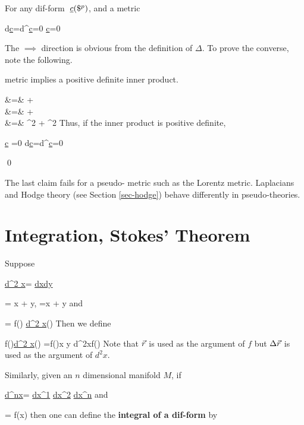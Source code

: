 \begin{claim}
\label{cl-d-c-ddagger-c}
For any dif-form $\pform{c}{p}$,
and a \Rien metric 

\beq
d\ul{c}=d^\dagger \ul{c}=0
\quad {}\quad
\Delta \ul{c}=0 
\eeq

\end{claim}
\proof

The $\implies$ direction is obvious
from the definition of $\Delta$.
To prove the converse, note 
the following.

\Rien metric implies  a positive definite inner product.

\beqa
{}
&=&
+
\\
&=&
+
\\
&=&
^2
+
^2
\eeqa
Thus,
if the inner product is 
positive definite,

\beq
\Delta\ul{c}
=0
\implies 
d\ul{c}=d^\dag \ul{c}=0
\eeq


\qed

The last claim fails for a pseudo-\Rien 
metric such as the Lorentz metric.
Laplacians and Hodge theory (see Section \ref{sec-hodge})
behave differently 
in pseudo-\Rien theories.


\section{Integration, Stokes' Theorem}

Suppose

\beq
\ul{d^2 x}= \ul{dx}\wedge\ul{dy}
\eeq

\beq
\vecr = x + y, \quad
\Delta\vecr =\Delta x 
+ \Delta y 
\eeq
and

\beq
\ul{\omega} = f(\vecr)
\ul{d^2 x}(\vecr)
\eeq
Then we define

\beq
\int \ul{\omega}\eqdef
\int
f(\vecr)\ul{d^2 x}(\Delta\vecr)
=\int f(\vecr)\Delta x\; \Delta y
\rarrow 
\int d^2x\;f(\vecr)
\eeq
Note that ${\vec{r}}$ 
is used as the argument
of $f$ but
$\Delta {\vec{r}}$
is used as the argument 
of $d^2x$.

Similarly, given an $n$ dimensional manifold $M$,
if

\beq
\ul{d^nx}= 
\ul{dx^1}
\wedge
\ul{dx^2}
\wedge
\cdots
\wedge
\ul{dx^n}
\eeq
and

\beq
{}=
f(x)
\eeq
then one can define
the {\bf integral of a dif-form} by

